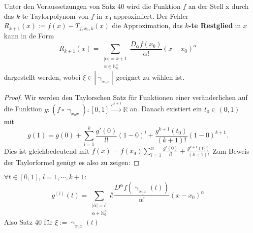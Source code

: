 Unter den Voraussetzungen von Satz 40 wird die Funktion $ f $ an der Stell x durch das $ k $-te Taylorpolynom von $ f $ in $ x_0 $ 
approximiert. Der Fehler $ R_{k+1} \left(x\right)  := f \left(x\right) - T_{f, x_0, k} \left(x\right)  $ die Approximation, das 
\textbf{$ k $-te Restglied} in $ x  $ kann in de Form
$$
R_{k+1}\left(x\right)  =\sum_{ \substack{ |\alpha | = k+1 \\ \alpha \in \mathbb{N} _{0}^{n} }} \frac{D_{\alpha }f \left(x_0\right) }{
\alpha !} \left( x -x_0 \right) ^{\alpha }
$$ dargestellt werden, wobei $ \xi \in  \left| \upgamma_{x_0x}  \right|  $  geeignet zu wählen ist.
\begin{proof}
	Wir werden den Taylorschen Satz für Funktionen einer veränderlichen auf die Funktion $ g: \left( f \circ \upgamma_{x_0x} \right) 
	: [0,1] \xrightarrow{c^{k+1}} \mathbb{R} $ an. Danach existiert ein $ t_0 \in  (0,1) $ mit
	$$
	g (1) = g \left(0\right) + \sum_{l=1}^{k} \frac{g' \left(0\right) }{l !} \left(  1 - 0 \right) ^{l} + \frac{g^{k+1} \left(t_0\right) 
	}{\left( k+1 \right) !} \left( 1-0  \right) ^{k+1}.
	$$
Dies ist gleichbedeutend mit $ f \left(x\right)  = f \left(x_0\right) \sum_{l=1}^{n} \frac{g' \left(0\right) }{l !} + \frac{g^{k+1}
\left(t_0\right) }{\left( k+1 \right) !}  $ Zum Beweis der Taylorformel genügt es also zu zeigen: 
\end{proof}
$ \forall  t \in  [0,1], \, l = 1 , \cdots,  k +1 :  $ 
\begin{equation}
	g^{\left(l\right) } \left(t\right) = \sum_{ \substack{ |\alpha | = l \\ \alpha  \in \mathbb{N}_{0}^{n}}} l! \frac{D^{\alpha}f 
	\left( \upgamma_{x_0x} \left(t\right)  \right) }{\alpha !} \left( x - x_0 \right) ^{\alpha } 
	\tag{1}
\end{equation}
Also Satz 40 für $ \xi := \upgamma_{x_0x} \left(t\right)  $ 
